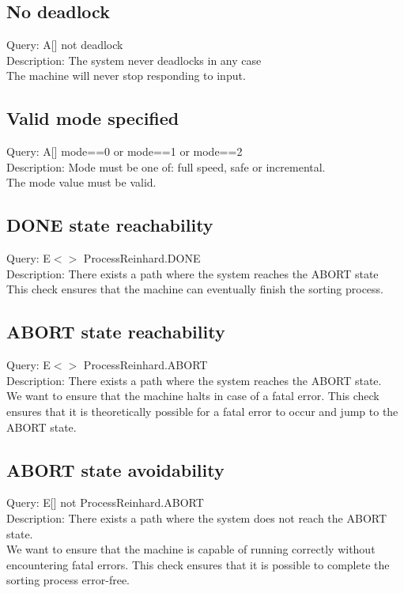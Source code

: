 \documentclass[a4paper,oneside,11pt]{article}
\begin{document}
\subsection{No deadlock}
Query: A[] not deadlock \\
Description: The system never deadlocks in any case \\
The machine will never stop responding to input.

\subsection{Valid mode specified}
Query: A[] mode==0 or mode==1 or mode==2 \\
Description: Mode must be one of: full speed, safe or incremental. \\
The mode value must be valid.

\subsection{DONE state reachability}
Query: E$<>$ ProcessReinhard.DONE \\
Description: There exists a path where the system reaches the ABORT state \\
This check ensures that the machine can eventually finish the sorting process.

\subsection{ABORT state reachability}
Query: E$<>$ ProcessReinhard.ABORT \\
Description: There exists a path where the system reaches the ABORT state.\\
We want to ensure that the machine halts in case of a fatal error. This check ensures that it is theoretically possible for a fatal error to occur and jump to the ABORT state.

\subsection{ABORT state avoidability}
Query: E[] not ProcessReinhard.ABORT \\
Description: There exists a path where the system does not reach the ABORT state.\\
We want to ensure that the machine is capable of running correctly without encountering fatal errors. This check ensures that it is possible to complete the sorting process error-free.
\end{document}
